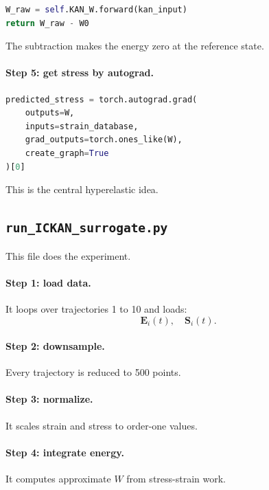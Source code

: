\documentclass[11pt]{article}
\newcommand{\E}{\bm{E}}
\newcommand{\Sstress}{\bm{S}}
\begin{document}
\begin{lstlisting}[language=Python]
W_raw = self.KAN_W.forward(kan_input)
return W_raw - W0
\end{lstlisting}

The subtraction makes the energy zero at the reference state.

\paragraph{Step 5: get stress by autograd.}

\begin{lstlisting}[language=Python]
predicted_stress = torch.autograd.grad(
    outputs=W,
    inputs=strain_database,
    grad_outputs=torch.ones_like(W),
    create_graph=True
)[0]
\end{lstlisting}

This is the central hyperelastic idea.

\subsection{\texttt{run\_ICKAN\_surrogate.py}}

This file does the experiment.

\paragraph{Step 1: load data.}

It loops over trajectories 1 to 10 and loads:
\[
  \E_i(t),\quad \Sstress_i(t).
\]

\paragraph{Step 2: downsample.}

Every trajectory is reduced to 500 points.

\paragraph{Step 3: normalize.}

It scales strain and stress to order-one values.

\paragraph{Step 4: integrate energy.}

It computes approximate $W$ from stress-strain work.
\end{document}
